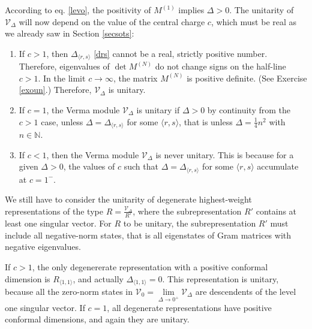 \documentclass[12pt, a4paper, notitlepage, twoside]{report}
\numberwithin{equation}{section}
\theoremstyle{break}
\begin{document}
According to eq. \eqref{levo}, the positivity of $M^{(1)}$ implies $\Delta >0$. 
The unitarity of $\mathcal{V}_\Delta$ will now depend on the value of the central charge $c$, which must be real 
as we already saw in Section \ref{secsots}:
\begin{enumerate}
 \item 
If $c > 1$, then $\Delta_{\langle r,s \rangle}$ \eqref{drs} cannot be a real, strictly positive number. 
Therefore, eigenvalues of $\det M^{(N)}$ do not change signs on the half-line $c > 1$.
In the limit $c \to \infty$, the matrix $M^{(N)}$ is positive definite. (See Exercise \ref{exoun}.) 
Therefore, $\mathcal{V}_\Delta$ is unitary. 
\item 
If $c=1$, the Verma module $\mathcal{V}_\Delta$ is unitary if $\Delta > 0$ by continuity from the $c>1$ case, unless $\Delta=\Delta_{\langle r,s \rangle}$ for some $\langle r,s \rangle$, that is unless $\Delta =\frac14 n^2$ with $n\in {\mathbb{N}}$.
\item 
If $c<1$, then the Verma module $\mathcal{V}_\Delta$ is never unitary. 
This is because for a given $\Delta>0$, the values of $c$ such that $\Delta = \Delta_{\langle r,s \rangle}$ for some $\langle r,s \rangle$ accumulate at $c=1^-$.
\end{enumerate}

We still have to consider the unitarity of degenerate highest-weight representations of the type $R=\frac{\mathcal{V}_\Delta}{R'}$, where the subrepresentation $R'$ contains at least one singular vector. 
For $R$ to be unitary, the subrepresentation $R'$ must include all negative-norm states, that is all eigenstates of Gram matrices with negative eigenvalues.

If $c > 1$, the only degenererate representation with a positive conformal dimension is $R_{\langle 1,1 \rangle}$, and actually $\Delta_{\langle 1,1 \rangle}=0$. This representation is unitary, because all the zero-norm states in $\mathcal{V}_0 = \underset{\Delta \to 0^+}{\lim} \mathcal{V}_\Delta$ are descendents of the level one singular vector. If $c=1$, all degenerate representations have positive conformal dimensions, and again they are unitary.
\end{document}
